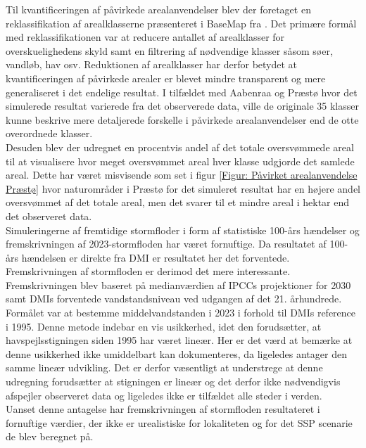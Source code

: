Til kvantificeringen af påvirkede arealanvendelser blev der foretaget en reklassifikation af arealklasserne præsenteret i BaseMap fra \cite{Jepsen_levin_2013, levin_basemap04_2022}. Det primære formål med reklassifikationen var at reducere antallet af arealklasser for overskuelighedens skyld samt en filtrering af nødvendige klasser såsom søer, vandløb, hav osv. Reduktionen af arealklasser har derfor betydet at kvantificeringen af påvirkede arealer er blevet mindre transparent og mere generaliseret i det endelige resultat. I tilfældet med Aabenraa og Præstø hvor det simulerede resultat varierede fra det observerede data, ville de originale 35 klasser kunne beskrive mere detaljerede forskelle i påvirkede arealanvendelser end de otte overordnede klasser. \\
Desuden blev der udregnet en procentvis andel af det totale oversvømmede areal til at visualisere hvor meget oversvømmet areal hver klasse udgjorde det samlede areal. Dette har været misvisende som set i figur \ref{Figur: Påvirket arealanvendelse Præstø} hvor naturområder i Præstø for det simuleret resultat har en højere andel oversvømmet af det totale areal, men det svarer til et mindre areal i hektar end det observeret data. \\ 


Simuleringerne af fremtidige stormfloder i form af statistiske 100-års hændelser og fremskrivningen af 2023-stormfloden har været fornuftige. Da resultatet af 100-års hændelsen er direkte fra DMI er resultatet her det forventede. Fremskrivningen af stormfloden er derimod det mere interessante. Fremskrivningen blev baseret på medianværdien af IPCCs projektioner for 2030 samt DMIs forventede vandstandsniveau ved udgangen af det 21. århundrede. Formålet var at bestemme middelvandstanden i 2023 i forhold til DMIs reference i 1995. Denne metode indebar en vis usikkerhed, idet den forudsætter, at havspejlsstigningen siden 1995 har været lineær. Her er det værd at bemærke at denne usikkerhed ikke umiddelbart kan dokumenteres, da \cite{danish_meteorological_institute_dmi_2024} ligeledes antager den samme lineær udvikling. Det er derfor væsentligt at understrege at denne udregning forudsætter at stigningen er lineær og det derfor ikke nødvendigvis afspejler observeret data og ligeledes ikke er tilfældet alle steder i verden. \\
Uanset denne antagelse har fremskrivningen af stormfloden resultateret i fornuftige værdier, der ikke er urealistiske for lokaliteten og for det SSP scenarie de blev beregnet på.\\


